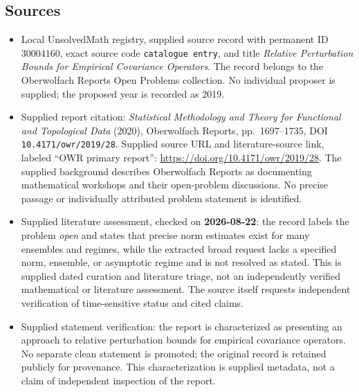 \documentclass[11pt]{article}
\begin{document}
\subsection{Sources}
\begin{itemize}
\item Local UnsolvedMath registry, supplied source record with permanent ID \(30004160\), exact source code \texttt{catalogue entry}, and title \emph{Relative Perturbation Bounds for Empirical Covariance Operators}. The record belongs to the Oberwolfach Reports Open Problems collection. No individual proposer is supplied; the proposed year is recorded as 2019.
\item Supplied report citation: \emph{Statistical Methodology and Theory for Functional and Topological Data} (2020), Oberwolfach Reports, pp.~1697--1735, DOI \texttt{10.4171/owr/2019/28}. Supplied source URL and literature-source link, labeled ``OWR primary report'': \url{https://doi.org/10.4171/owr/2019/28}. The supplied background describes Oberwolfach Reports as documenting mathematical workshops and their open-problem discussions. No precise passage or individually attributed problem statement is identified.
\item Supplied literature assessment, checked on \textbf{2026-08-22}: the record labels the problem \emph{open} and states that precise norm estimates exist for many ensembles and regimes, while the extracted broad request lacks a specified norm, ensemble, or asymptotic regime and is not resolved as stated. This is supplied dated curation and literature triage, not an independently verified mathematical or literature assessment. The source itself requests independent verification of time-sensitive status and cited claims.
\item Supplied statement verification: the report is characterized as presenting an approach to relative perturbation bounds for empirical covariance operators. No separate clean statement is promoted; the original record is retained publicly for provenance. This characterization is supplied metadata, not a claim of independent inspection of the report.
\end{itemize}
\end{document}
